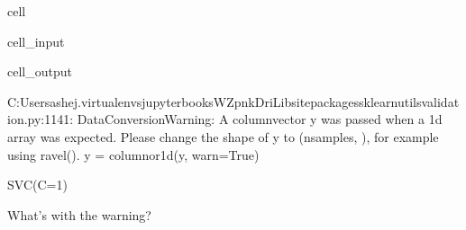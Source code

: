 \documentclass[letterpaper,10pt,english]{jupyterBook}
\begin{document}
\begin{sphinxuseclass}{cell}\begin{sphinxVerbatimInput}

\begin{sphinxuseclass}{cell_input}
\begin{sphinxVerbatim}[commandchars=\\\{\}]
   

    
\end{sphinxVerbatim}

\end{sphinxuseclass}\end{sphinxVerbatimInput}
\begin{sphinxVerbatimOutput}

\begin{sphinxuseclass}{cell_output}
\begin{sphinxVerbatim}[commandchars=\\\{\}]
C:\PYGZbs{}Users\PYGZbs{}ashej\PYGZbs{}.virtualenvs\PYGZbs{}jupyter\PYGZhy{}books\PYGZhy{}WZpnkDri\PYGZbs{}Lib\PYGZbs{}site\PYGZhy{}packages\PYGZbs{}sklearn\PYGZbs{}utils\PYGZbs{}validation.py:1141: DataConversionWarning: A column\PYGZhy{}vector y was passed when a 1d array was expected. Please change the shape of y to (n\PYGZus{}samples, ), for example using ravel().
  y = column\PYGZus{}or\PYGZus{}1d(y, warn=True)
\end{sphinxVerbatim}

\begin{sphinxVerbatim}[commandchars=\\\{\}]
SVC(C=1)
\end{sphinxVerbatim}

\end{sphinxuseclass}\end{sphinxVerbatimOutput}

\end{sphinxuseclass}
\sphinxAtStartPar
What’s with the warning? 
\end{document}
